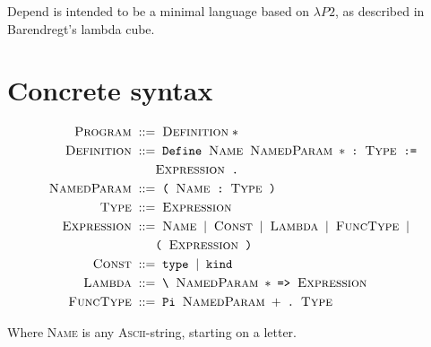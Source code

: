 \documentclass{article}
\newcommand{\nt}[1]{\;\textsc{#1}\;}
\newcommand{\tm}[1]{\;\texttt{#1}\;}
\begin{document}
Depend is intended to be a minimal language based on
$\lambda{}P2$, as described in Barendregt's lambda cube.

\section{Concrete syntax}
\begin{align*}
    \nt{Program} &::= \nt{Definition} *  \\
    \nt{Definition} &::= \tm{Define} \nt{Name}
                         \nt{NamedParam}* \tm{:}
                         \nt{Type} \tm{:=} \\
                    &\phantom{::=} \nt{Expression} \tm{.} \\
    \nt{NamedParam} &::= \tm{(} \nt{Name} \tm{:} \nt{Type} \tm{)} \\
    \nt{Type} &::= \nt{Expression} \\
    \nt{Expression} &::= \nt{Name} \mid \nt{Const} \mid \nt{Lambda} \mid \nt{FuncType} \mid\\
                    &\phantom{::=} \tm{(} \nt{Expression} \tm{)} \\
    \nt{Const} &::= \tm{type} \mid \tm{kind} \\
    \nt{Lambda} &::= \tm{\textbackslash} \nt{NamedParam}* \tm{=>} \nt{Expression} \\
    \nt{FuncType} &::= \tm{Pi} \nt{NamedParam}+ \tm{.} \nt{Type}
\end{align*}

Where \nt{Name} is any \textsc{Ascii}-string, starting on a letter.
\end{document}

